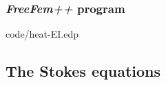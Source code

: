 \documentclass[12pt]{article}
\newcommand{\FF}{\textit{FreeFem++}\xspace}
\begin{document}

\subsubsection{\FF program}


{code/heat-EI.edp}

\subsection{The Stokes equations}
\label{sec:stokes}
\end{document}
